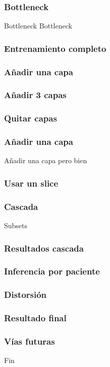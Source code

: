\documentclass{beamer}
\begin{document}
\begin{frame}
\frametitle{Bottleneck}

\begin{block}{Bottleneck}
Bottleneck
\end{block}

\end{frame}



\begin{frame}
\frametitle{Entrenamiento completo}

\end{frame}



\begin{frame}
\frametitle{Añadir una capa}

\end{frame}



\begin{frame}
\frametitle{Añadir 3 capas}

\end{frame}



\begin{frame}
\frametitle{Quitar capas}

\end{frame}



\begin{frame}
\frametitle{Añadir una capa}
Añadir una capa pero bien

\end{frame}



\begin{frame}
\frametitle{Usar un slice}

\end{frame}



\begin{frame}
\frametitle{Cascada}
Subsets

\end{frame}



\begin{frame}
\frametitle{Resultados cascada}

\end{frame}



\begin{frame}
\frametitle{Inferencia por paciente}

\end{frame}



\begin{frame}
\frametitle{Distorsión}

\end{frame}



\begin{frame}
\frametitle{Resultado final}

\end{frame}



\begin{frame}
\frametitle{Vías futuras}

\end{frame}



\begin{frame}
\Huge{\centerline{Fin}}
\end{frame}
\end{document}
